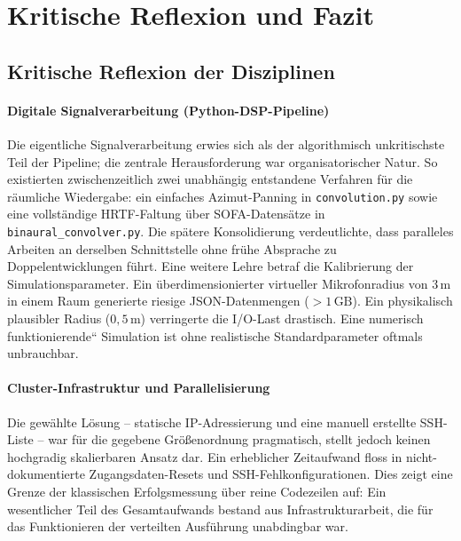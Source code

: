 
\section{Kritische Reflexion und Fazit}
\label{sec:reflexion}

\subsection{Kritische Reflexion der Disziplinen}
\label{subsec:kritische_reflexion}

\paragraph{Digitale Signalverarbeitung (Python-DSP-Pipeline)}
Die eigentliche Signalverarbeitung erwies sich als der algorithmisch unkritischste Teil der Pipeline; die zentrale Herausforderung war organisatorischer Natur.
So existierten zwischenzeitlich zwei unabhängig entstandene Verfahren für die räumliche Wiedergabe: ein einfaches Azimut-Panning in \texttt{convolution.py} sowie eine vollständige HRTF-Faltung über SOFA-Datensätze in \texttt{binaural\_convolver.py}.
Die spätere Konsolidierung verdeutlichte, dass paralleles Arbeiten an derselben Schnittstelle ohne frühe Absprache zu Doppelentwicklungen führt.
Eine weitere Lehre betraf die Kalibrierung der Simulationsparameter.
Ein überdimensionierter virtueller Mikrofonradius von $3\,\text{m}$ in einem Raum generierte riesige JSON-Datenmengen ($>1\,\text{GB}$).
Ein physikalisch plausibler Radius ($0{,}5\,\text{m}$) verringerte die I/O-Last drastisch.
Eine numerisch \quotedblbase funktionierende\textquotedblleft{} Simulation ist ohne realistische Standardparameter oftmals unbrauchbar.

\paragraph{Cluster-Infrastruktur und Parallelisierung}
Die gewählte Lösung -- statische IP-Adressierung und eine manuell erstellte SSH-Liste -- war für die gegebene Größenordnung pragmatisch, stellt jedoch keinen hochgradig skalierbaren Ansatz dar. Ein erheblicher Zeitaufwand floss in nicht-dokumentierte Zugangsdaten-Resets und SSH-Fehlkonfigurationen. Dies zeigt eine Grenze der klassischen Erfolgsmessung über reine Codezeilen auf: Ein wesentlicher Teil des Gesamtaufwands bestand aus Infrastrukturarbeit, die für das Funktionieren der verteilten Ausführung unabdingbar war.

